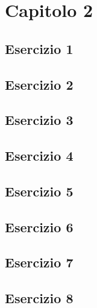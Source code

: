 \section{\textbf{Capitolo 2}}
\subsection{Esercizio 1}

\subsection{Esercizio 2}

\subsection{Esercizio 3}

\subsection{Esercizio 4}

\subsection{Esercizio 5}

\subsection{Esercizio 6}

\subsection{Esercizio 7}

\subsection{Esercizio 8}
